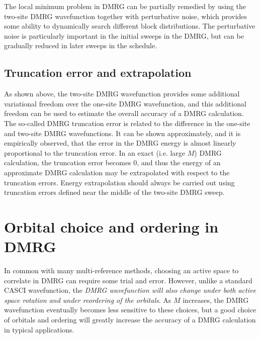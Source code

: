 \documentclass[letterpaper,12pt,aps, pra]{revtex4-1}
\begin{document}
The local minimum problem in DMRG can be partially remedied by using the two-site DMRG wavefunction
together with perturbative noise, which provides some ability
to dynamically search different block distributions. The perturbative noise is particularly important
in the initial sweeps in the DMRG, but can be gradually reduced 
in later sweeps in the schedule.


\subsection{Truncation error and extrapolation}\label{sec:convergence2}

As shown above, the two-site DMRG wavefunction provides some additional
variational freedom over the one-site DMRG wavefunction, and this additional freedom
can be used to estimate the overall accuracy of a DMRG calculation. The so-called DMRG truncation
error is related to the difference in the one-site and two-site DMRG wavefunctions. 
 It can be shown approximately, and it is empirically observed,
that the error in the DMRG energy is almost linearly proportional to the truncation error. 
In an exact
(i.e. large $M$) DMRG calculation, the truncation error becomes 0, and thus
the energy of an approximate DMRG calculation may be  extrapolated with respect to the truncation errors. %
Energy extrapolation should always be carried out using truncation errors defined near the middle of the two-site DMRG sweep.

\section{Orbital choice and ordering in DMRG}\label{sec:appendix2}

In common with many multi-reference methods, choosing an active space to correlate in DMRG can
require some trial and error. However, unlike a standard CASCI wavefunction, the {\it DMRG wavefunction will also  change under both active space rotation and under reordering of the orbitals}.
As $M$ increases, the DMRG wavefunction eventually becomes less sensitive to these choices, but
a good choice of orbitals and ordering will greatly increase the accuracy of a DMRG calculation in typical applications. 
\end{document}
